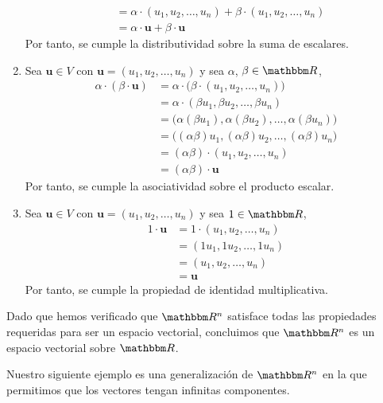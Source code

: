 \begin{examplebox}{}{}
\begin{enumerate}[label=\roman*), topsep=6pt, itemsep=0pt]
\begin{align*}
            & = \alpha \cdot (u_1, u_2, \dots, u_n) + \beta \cdot (u_1, u_2, \dots, u_n) \\
            & = \alpha \cdot \mathbf{u} + \beta \cdot \mathbf{u}
        \end{align*}
        Por tanto, se cumple la distributividad sobre la suma de escalares.
        \item Sea $\mathbf{u} \in V$ con $\mathbf{u} = (u_1, u_2, \dots, u_n)$ y sea $\alpha$, $\beta \in \RR$,
        \begin{align*}
            \alpha \cdot (\beta \cdot \mathbf{u}) & = \alpha \cdot \big(\beta \cdot (u_1, u_2, \dots, u_n) \big) \\
            & = \alpha \cdot (\beta u_1, \beta u_2, \dots, \beta u_n) \\
            & = \big( \alpha (\beta u_1), \alpha (\beta u_2), \dots, \alpha (\beta u_n) \big) \\
            & = \big( (\alpha\beta) u_1, (\alpha\beta) u_2, \dots, (\alpha\beta) u_n \big) \\
            & = (\alpha\beta) \cdot (u_1, u_2, \dots, u_n) \\
            & = (\alpha\beta) \cdot \mathbf{u}
        \end{align*}
        Por tanto, se cumple la asociatividad sobre el producto escalar.
        \item Sea $\mathbf{u} \in V$ con $\mathbf{u} = (u_1, u_2, \dots, u_n)$ y sea $1 \in \RR$,
        \begin{align*}
            1 \cdot \mathbf{u} & = 1 \cdot (u_1, u_2, \dots, u_n) \\
            & = (1 u_1, 1 u_2, \dots, 1 u_n) \\
            & = (u_1, u_2, \dots, u_n) \\
            & = \mathbf{u}
        \end{align*}
        Por tanto, se cumple la propiedad de identidad multiplicativa.
    \end{enumerate}
    Dado que hemos verificado que $\RR[n]$ satisface todas las propiedades requeridas para ser un espacio vectorial, concluimos que $\RR[n]$ es un espacio vectorial sobre $\RR$.
\end{examplebox}

Nuestro siguiente ejemplo es una generalización de $\RR[n]$ en la que permitimos que los vectores tengan infinitas componentes.

\newpage

